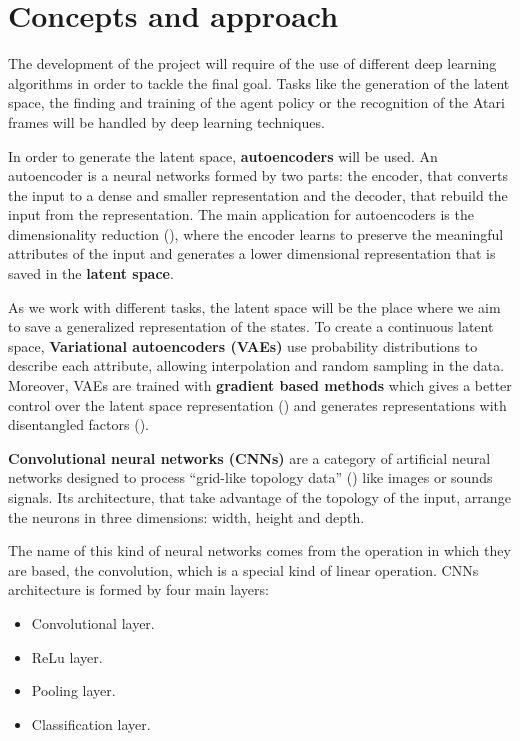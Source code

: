 \section{Concepts and approach}

The development of the project will require of the use of different deep learning algorithms in order to tackle the final goal. Tasks like the generation of the latent space, the finding and training of the agent policy or the recognition of the Atari frames will be handled by deep learning techniques.

In order to generate the latent space, \textbf{autoencoders} will be used. An autoencoder is a neural networks formed by two parts: the encoder, that converts the input to a dense and smaller representation and the decoder, that rebuild the input from the representation. The main application for autoencoders is the dimensionality reduction (\cite{Hinton504}), where the encoder learns to preserve the meaningful attributes of the input and generates a lower dimensional representation that is saved in the \textbf{latent space}.

As we work with different tasks, the latent space will be the place where we aim to save a generalized representation of the states. To create a continuous latent space, \textbf{Variational autoencoders (VAEs)} use probability distributions to describe each attribute, allowing interpolation and random sampling in the data. Moreover, VAEs are trained with \textbf{gradient based methods} which gives a better control over the latent space representation (\cite{goodfellow2016deep}) and generates representations with disentangled factors (\cite{2016arXiv160605579H}).

\textbf{Convolutional neural networks (CNNs)} are a category of artificial neural networks designed to process ``grid-like topology data'' (\cite{goodfellow2016deep}) like images or sounds signals. Its architecture, that take advantage of the topology of the input, arrange the neurons in three dimensions: width, height and depth. 

The name of this kind of neural networks comes from the operation in which they are based, the convolution, which is a special kind of linear operation. CNNs architecture is formed by four main layers:

\begin{itemize}
    \item Convolutional layer.
    \item ReLu layer.
    \item Pooling layer.
    \item Classification layer.
\end{itemize}

